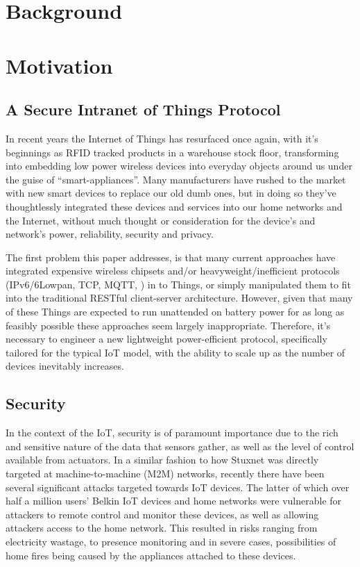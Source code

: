 \documentclass[conference]{./sty/IEEEtran}
\begin{document}
\section{Background} %
\label{sec:background}



\section{Motivation} %
\label{sec:motivation}
\subsection{A Secure Intranet of Things Protocol} %
\label{sub:intranet_of_things_protocol}
In recent years the Internet of Things has resurfaced once again, with it's beginnings as RFID tracked products in a warehouse stock floor, transforming into embedding low power wireless devices into everyday objects around us under the guise of ``smart-appliances''. Many manufacturers have rushed to the market with new smart devices to replace our old dumb ones, but in doing so they've thoughtlessly integrated these devices and services into our home networks and the Internet, without much thought or consideration for the device's and network's power, reliability, security and privacy. 

The first problem this paper addresses, is that many current approaches have integrated expensive wireless chipsets and/or heavyweight/inefficient protocols (IPv6/6Lowpan, TCP, MQTT\cite{MQTT}, \cite{xAP}) in to Things, or simply manipulated them to fit into the traditional RESTful client-server architecture\cite{IETF_COAP_HTTP}. However, given that many of these Things are expected to run unattended on battery power for as long as feasibly possible these approaches seem largely inappropriate. Therefore, it's necessary to engineer a new lightweight power-efficient protocol, specifically tailored for the typical IoT model, with the ability to scale up as the number of devices inevitably increases.

\subsection{Security} %
\label{sub:motivation_security}
In the context of the IoT, security is of paramount importance due to the rich and sensitive nature of the data that sensors gather, as well as the level of control available from actuators. In a similar fashion to how Stuxnet was directly targeted at machine-to-machine (M2M) networks\cite{Stuxnet}, recently there have been several significant attacks targeted towards IoT devices\cite{IoTWorm,BelkinWemo}. The latter of which over half a million users' Belkin IoT devices and home networks were vulnerable for attackers to remote control and monitor these devices, as well as allowing attackers access to the home network. This resulted in risks ranging from electricity wastage, to presence monitoring and in severe cases, possibilities of home fires being caused by the appliances attached to these devices.
\end{document}
